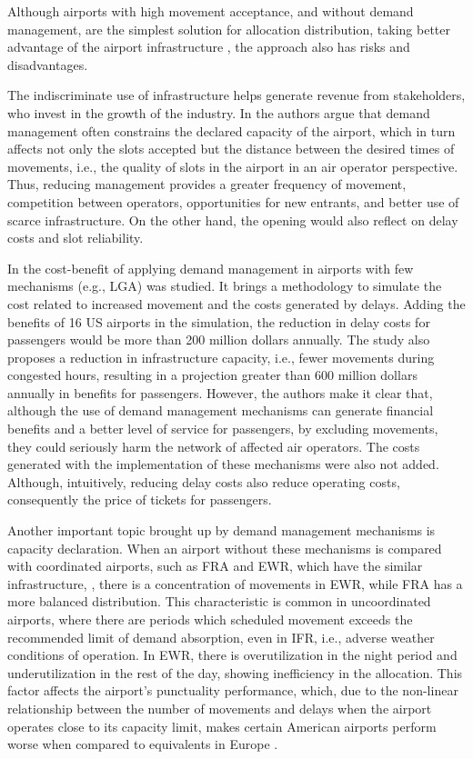 Although airports with high movement acceptance, and without demand management, are the simplest solution for allocation distribution, taking better advantage of the airport infrastructure \cite{gillen2016airport}, the approach also has risks and disadvantages.

The indiscriminate use of infrastructure helps generate revenue from stakeholders, who invest in the growth of the industry. In \cite{zografos2017increasing} the authors argue that demand management often constrains the declared capacity of the airport, which in turn affects not only the slots accepted but the distance between the desired times of movements, i.e., the quality of slots in the airport in an air operator perspective. Thus, reducing management provides a greater frequency of movement, competition between operators, opportunities for new entrants, and better use of scarce infrastructure. On the other hand, the opening would also reflect on delay costs and slot reliability.

In \cite{swaroop2012more} the cost-benefit of applying demand management in airports with few mechanisms (e.g., \acrshort{LGA}) was studied. It brings a methodology to simulate the cost related to increased movement and the costs generated by delays. Adding the benefits of 16 US airports in the simulation, the reduction in delay costs for passengers would be more than 200 million dollars annually. The study also proposes a reduction in infrastructure capacity, i.e., fewer movements during congested hours, resulting in a projection greater than 600 million dollars annually in benefits for passengers. However, the authors make it clear that, although the use of demand management mechanisms can generate financial benefits and a better level of service for passengers, by excluding movements, they could seriously harm the network of affected air operators. The costs generated with the implementation of these mechanisms were also not added. Although, intuitively, reducing delay costs also reduce operating costs, consequently the price of tickets for passengers.

Another important topic brought up by demand management mechanisms is capacity declaration. When an airport without these mechanisms is compared with coordinated airports, such as \acrfull{FRA} and \acrfull{EWR}, which have the similar infrastructure, , there is a concentration of movements in \acrshort{EWR}, while \acrshort{FRA} has a more balanced distribution. This characteristic is common in uncoordinated airports, where there are periods which scheduled movement exceeds the recommended limit of demand absorption, even in \acrfull{IFR}, i.e., adverse weather conditions of operation. In \acrshort{EWR}, there is overutilization in the night period and underutilization in the rest of the day, showing inefficiency in the allocation. This factor affects the airport's punctuality performance, which, due to the non-linear relationship between the number of movements and delays when the airport operates close to its capacity limit, makes certain American airports perform worse when compared to equivalents in Europe \cite{gillen2016airport}.

